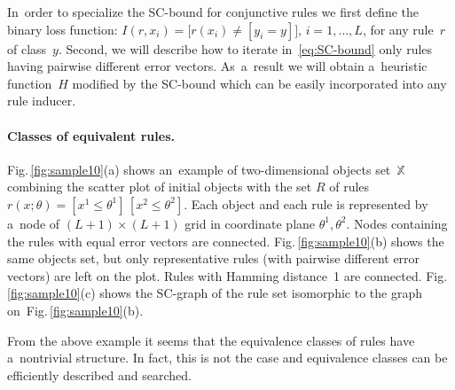 \documentclass{article}
\def\XX{\mathbb{X}}
\renewcommand{\leq}{\leqslant}
\begin{document}
\medskip
In~order to specialize the SC-bound for conjunctive rules
we first define the binary loss function:
$I(r,x_i) = \bigl[ r(x_i) \neq [y_i\!=\!y] \bigr]$,\; $i=1,\ldots,L$,
for any rule~$r$ of class~$y$.
Second, we will describe how to iterate in~\eqref{eq:SC-bound}
only rules having pairwise different error vectors.
As~a~result we will obtain
a~heuristic function~$H$ modified by the SC-bound
which can be easily incorporated into any rule inducer.

\paragraph{Classes of equivalent rules.}

Fig.\,\ref{fig:sample10}(a) shows an~example of two-dimensional objects set~$\XX$
combining the scatter plot of initial objects with the set $R$ of rules
$r(x;\theta) =[x^1\leq \theta^1]\,[x^2\leq\theta^2]$.
Each object and each rule is represented
by a~node of ${(L+1)\times(L+1)}$ grid in coordinate plane $\theta^1,\theta^2$.
Nodes containing the rules with equal error vectors are connected.
Fig.\,\ref{fig:sample10}(b)
shows the same objects set,
but only representative rules (with pairwise different error vectors) are left on the plot.
Rules with Hamming distance~1 are connected.
Fig.\,\ref{fig:sample10}(c)
shows the SC-graph of the rule set  isomorphic to the graph
on~Fig.\,\ref{fig:sample10}(b).

From the above example it seems that the equivalence classes of rules have a~nontrivial structure.
In fact, this is not the case and equivalence classes can be efficiently described and searched.
\end{document}
